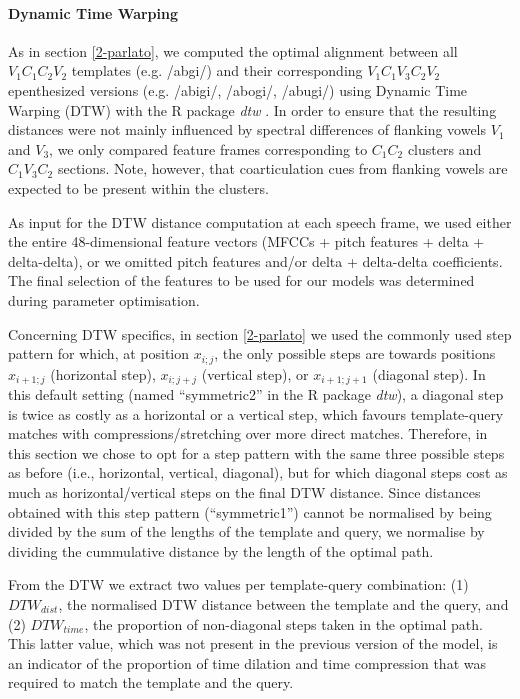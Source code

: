 \paragraph{Dynamic Time Warping}

As in section \ref{2-parlato}, we computed the optimal alignment between all $V_{1}C_{1}C_{2}V_{2}$ templates (e.g. /abgi/) and their corresponding $V_{1}C_{1}V_{3}C_{2}V_{2}$ epenthesized versions (e.g. /abigi/, /abogi/, /abugi/) using Dynamic Time Warping (DTW) \cite{sakoe1978} with the R package \textit{dtw} \cite{R-dtw}. In order to ensure that the resulting distances were not mainly influenced by spectral differences of flanking vowels $V_{1}$ and $V_{3}$, we only compared feature frames corresponding to $C_{1}C_{2}$ clusters and $C_{1}V_{3}C_{2}$ sections. Note, however, that coarticulation cues from flanking vowels are expected to be present within the clusters.

As input for the DTW distance computation at each speech frame, we used either the entire 48-dimensional feature vectors (MFCCs + pitch features + delta + delta-delta), or we omitted pitch features and/or delta + delta-delta coefficients. The final selection of the features to be used for our models was determined during parameter optimisation. 

Concerning DTW specifics, in section \ref{2-parlato} we used the commonly used step pattern for which, at position $x_{i;j}$, the only possible steps are towards positions $x_{i+1;j}$ (horizontal step), $x_{i;j+j}$ (vertical step), or $x_{i+1;j+1}$ (diagonal step). In this default setting (named ``symmetric2'' in the R package \textit{dtw}), a diagonal step is twice as costly as a horizontal or a vertical step, which favours template-query matches with compressions/stretching over more direct matches. Therefore, in this section we chose to opt for a step pattern with the same three possible steps as before (i.e., horizontal, vertical, diagonal), but for which diagonal steps cost as much as horizontal/vertical steps on the final DTW distance. Since distances obtained with this step pattern (``symmetric1'') cannot be normalised by being divided by the sum of the lengths of the template and query, we normalise by dividing the cummulative distance by the length of the optimal path.

From the DTW we extract two values per template-query combination: (1) $DTW_{dist}$, the normalised DTW distance between the template and the query, and (2) $DTW_{time}$, the proportion of non-diagonal steps taken in the optimal path. This latter value, which was not present in the previous version of the model, is an indicator of the proportion of time dilation and time compression that was required to match the template and the query.     

